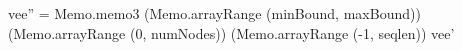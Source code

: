 vee'' = Memo.memo3 (Memo.arrayRange (minBound, maxBound)) 
                   (Memo.arrayRange (0, numNodes))
                   (Memo.arrayRange (-1, seqlen)) 
                   vee'
